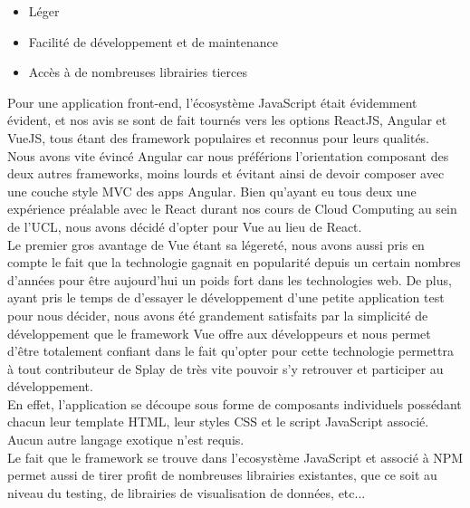 \documentclass{eplmastersthesis}
\begin{document}
        \begin{itemize}
          \item Léger
          \item Facilité de développement et de maintenance
          \item Accès à de nombreuses librairies tierces
        \end{itemize}

        Pour une application front-end, l'écosystème JavaScript était
        évidemment évident, et nos avis se sont de fait tournés vers
        les options ReactJS, Angular et VueJS, tous étant des framework
        populaires et reconnus pour leurs qualités.\\
        Nous avons vite évincé Angular car nous préférions l'orientation
        composant des deux autres frameworks, moins lourds et évitant
        ainsi de devoir composer avec une couche style MVC des apps Angular.
        Bien qu'ayant eu tous deux une expérience préalable avec le React
        durant nos cours de Cloud Computing au sein de l'UCL, nous avons
        décidé d'opter pour Vue au lieu de React.\\

        Le premier gros avantage de Vue étant sa légereté, nous avons
        aussi pris en compte le fait que la technologie gagnait en popularité
        depuis un certain nombres d'années pour être aujourd'hui un poids fort
        dans les technologies web. De plus, ayant pris le temps de d'essayer
        le développement d'une petite application test pour nous décider, nous
        avons été grandement satisfaits par la simplicité de développement que
        le framework Vue offre aux développeurs et nous permet d'être
        totalement confiant dans le fait qu'opter pour cette technologie
        permettra à tout contributeur de Splay de très vite pouvoir s'y
        retrouver et participer au développement.\\
        En effet, l'application se découpe sous forme de composants individuels
        possédant chacun leur template HTML, leur styles CSS et le script
        JavaScript associé. Aucun autre langage exotique n'est requis.\\
        Le fait que le framework se trouve dans l'ecosystème JavaScript et
        associé à NPM permet aussi de tirer profit de nombreuses librairies
        existantes, que ce soit au niveau du testing, de librairies de
        visualisation de données, etc...\\
\end{document}
